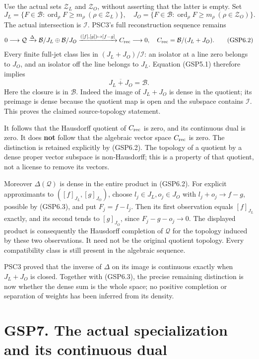 Use the actual sets \(\mathscr Z_L\) and \(\mathscr Z_O\), without
asserting that the latter is empty. Set \[
J_L=\{F\in\mathcal B:\operatorname{ord}_\rho F\ge m_\rho\ (\rho\in\mathscr Z_L)\},
\quad
J_O=\{F\in\mathcal B:\operatorname{ord}_\rho F\ge m_\rho\ (\rho\in\mathscr Z_O)\}.
\tag{GSP6.1}
\] The actual intersection is \(\mathcal I\). PSC3's full reconstruction
sequence remains \[
0\longrightarrow\mathcal Q\xrightarrow{\Delta}
\mathcal B/J_L\oplus\mathcal B/J_O
\xrightarrow{([f],[g])\mapsto[f-g]}C_{\rm rec}\longrightarrow0,
\quad C_{\rm rec}=\mathcal B/(J_L+J_O).
\tag{GSP6.2}
\] Every finite full-jet class lies in \((J_L+J_O)/\mathcal I\): an
isolator at a line zero belongs to \(J_O\), and an isolator off the line
belongs to \(J_L\). Equation (GSP5.1) therefore implies \[
\boxed{\overline{J_L+J_O}=\mathcal B.}
\tag{GSP6.3}
\] Here the closure is in \(\mathcal B\). Indeed the image of
\(J_L+J_O\) is dense in the quotient; its preimage is dense because the
quotient map is open and the subspace contains \(\mathcal I\). This
proves the claimed source-topology statement.

It follows that the Hausdorff quotient of \(C_{\rm rec}\) is zero, and
its continuous dual is zero. It does \textbf{not} follow that the
algebraic vector space \(C_{\rm rec}\) is zero. The distinction is
retained explicitly by (GSP6.2). The topology of a quotient by a dense
proper vector subspace is non-Hausdorff; this is a property of that
quotient, not a license to remove its vectors.

Moreover \(\Delta(\mathcal Q)\) is dense in the entire product in
(GSP6.2). For explicit approximants to \(([f]_{J_L},[g]_{J_O})\), choose
\(l_j\in J_L,o_j\in J_O\) with \(l_j+o_j\to f-g\), possible by (GSP6.3),
and put \(F_j=f-l_j\). Then its first observation equals \([f]_{J_L}\)
exactly, and its second tends to \([g]_{J_O}\), since \(F_j-g-o_j\to0\).
The displayed product is consequently the Hausdorff completion of
\(\mathcal Q\) for the topology induced by these two observations. It
need not be the original quotient topology. Every compatibility class is
still present in the algebraic sequence.

PSC3 proved that the inverse of \(\Delta\) on its image is continuous
exactly when \(J_L+J_O\) is closed. Together with (GSP6.3), the precise
remaining distinction is now whether the dense sum is the whole space;
no positive completion or separation of weights has been inferred from
its density.

\section{GSP7. The actual specialization and its continuous
dual}\label{gsp7.-the-actual-specialization-and-its-continuous-dual}

